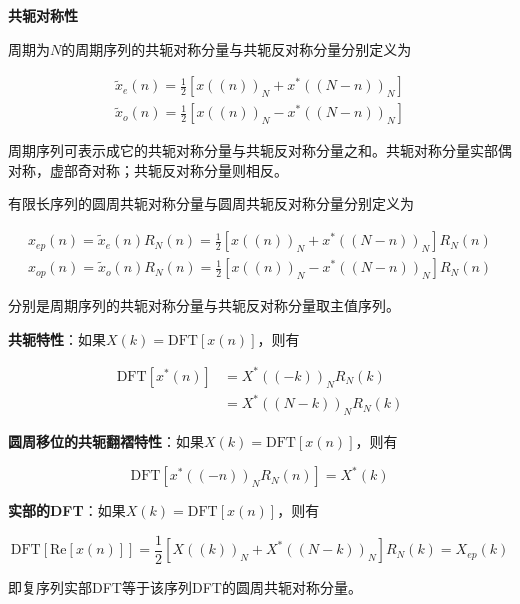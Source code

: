 \documentclass[cn, hazy, blue, normal, 14pt]{elegantnote}
\begin{document}
\textbf{共轭对称性}

周期为$N$的周期序列的共轭对称分量与共轭反对称分量分别定义为

\begin{equation}
\begin{aligned}
    \widetilde{x}_e(n)=\frac{1}{2}\left[{x}((n))_N+{x}^*((N-n))_N\right] \\ 
    \widetilde{x}_o(n)=\frac{1}{2}\left[{x}((n))_N-{x}^*((N-n))_N\right]
\end{aligned}
\end{equation}

周期序列可表示成它的共轭对称分量与共轭反对称分量之和。共轭对称分量实部偶对称，虚部奇对称；共轭反对称分量则相反。

有限长序列的圆周共轭对称分量与圆周共轭反对称分量分别定义为

\begin{equation}
\begin{aligned}
    {x}_{ep}(n)=\widetilde{x}_e(n)R_N(n)=\frac{1}{2}\left[{x}((n))_N+{x}^*((N-n))_N\right]R_N(n) \\ 
    {x}_{op}(n)=\widetilde{x}_o(n)R_N(n)=\frac{1}{2}\left[{x}((n))_N-{x}^*((N-n))_N\right]R_N(n)
\end{aligned}
\end{equation}

分别是周期序列的共轭对称分量与共轭反对称分量取主值序列。

\textbf{共轭特性}：如果$X(k)=\text{DFT}[x(n)]$，则有

\begin{equation}
\begin{aligned}
    \text{DFT}[x^*(n)]&=X^*((-k))_N R_N(k) \\
    &=X^*((N-k))_N R_N(k)
\end{aligned}
\end{equation}

\textbf{圆周移位的共轭翻褶特性}：如果$X(k)=\text{DFT}[x(n)]$，则有

\begin{equation}
    \text{DFT}[x^*((-n))_N R_N(n)]=X^*(k)
\end{equation}

\textbf{实部的DFT}：如果$X(k)=\text{DFT}[x(n)]$，则有

\begin{equation}
    \text{DFT}[\text{Re}[x(n)]]=\frac{1}{2}[X((k))_N+X^*((N-k))_N]R_N(k)=X_{ep}(k)
\end{equation}

即复序列实部DFT等于该序列DFT的圆周共轭对称分量。
\end{document}
